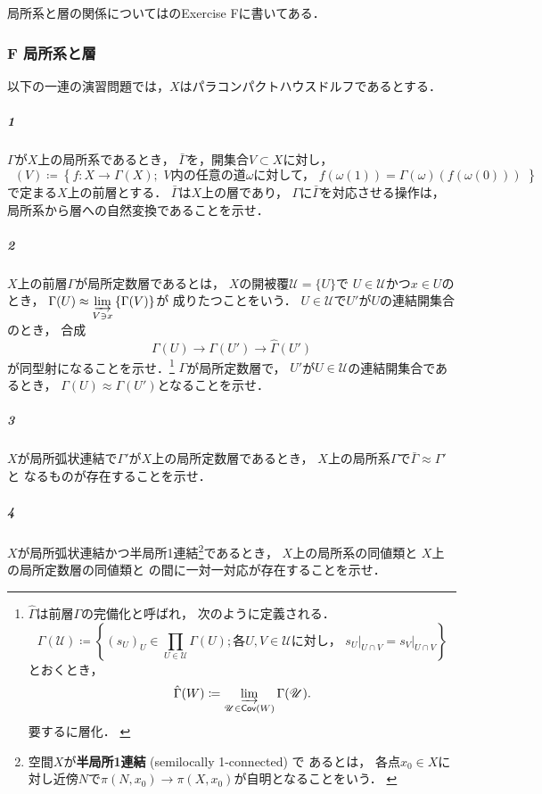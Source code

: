 \subsection{{\cite[Chap 6]{Sp66}}}

局所系と層の関係については\cite[Chap 6]{Sp66}のExercise Fに書いてある．

\subsubsection*{F 局所系と層}

以下の一連の演習問題では，\(X\)はパラコンパクトハウスドルフであるとする．

\subparagraph{1}
\(\Gamma\)が\(X\)上の局所系であるとき，
\(\bar{\Gamma}\)を，開集合\(V\subset X\)に対し，
\[\mathop{\bar{\Gamma}}(V)\coloneqq\left\{
    f\colon X\to \Gamma(X);\text{
        \(V\)内の任意の道\(\omega\)に対して，
        \(f(\omega(1))
        =\Gamma(\omega)\left(f\left(\omega(0)\right)\right)\)
    }
\right\}\]で定まる\(X\)上の前層とする．
\(\bar{\Gamma}\)は\(X\)上の層であり，
\(\Gamma\)に\(\bar{\Gamma}\)を対応させる操作は，
局所系から層への自然変換であることを示せ．


\subparagraph{2}
\(X\)上の前層\(\Gamma\)が局所定数層であるとは，
\(X\)の開被覆\(\mathscr{U}=\{U\}\)で
\(U\in\mathscr{U}\)かつ\(x\in U\)のとき，
\(\Gamma(U)\approx\indlim[V\ni x]\left\{\Gamma(V)\right\}\)が
成りたつことをいう．
\(U\in\mathscr{U}\)で\(U'\)が\(U\)の連結開集合のとき，
合成
\[
    \Gamma(U)\to\Gamma(U')\to\hat{\Gamma}(U')
\]
が同型射になることを示せ．\footnote{
    \(\hat{\Gamma}\)は前層\(\Gamma\)の完備化と呼ばれ，
    次のように定義される．
    \[
        \Gamma(\mathscr{U})\coloneqq\left\{(s_U)_U\in\prod_{U\in\mathscr{U}}^{}\Gamma(U);
            \text{各\(U, V\in\mathscr{U}\)に対し，
            \(s_U\rvert_{U\cap V}
            =s_V\rvert_{U\cap V}\)}\right\}
    \]とおくとき，
    \[
        \hat{\Gamma}(W)\coloneqq 
        \indlim[\mathscr{U}\in\Cov(W)]\Gamma(\mathscr{U}).
    \]要するに層化．
    \cite[p.78]{Sp66}
    }
\(\Gamma\)が局所定数層で，
\(U'\)が\(U\in\mathscr{U}\)の連結開集合であるとき，
\(\Gamma(U)\approx\Gamma(U')\)となることを示せ．


\subparagraph{3}
\(X\)が局所弧状連結で\(\Gamma'\)が\(X\)上の局所定数層であるとき，
\(X\)上の局所系\(\Gamma\)で\(\bar{\Gamma}\approx\Gamma'\)と
なるものが存在することを示せ．

\subparagraph{4}
\(X\)が局所弧状連結かつ半局所1連結\footnote{
    空間\(X\)が\textbf{半局所1連結} (semilocally 1-connected) で
    あるとは，
    各点\(x_0\in X\)に対し近傍\(N\)で\(
        \pi(N,x_0)\to\pi(X,x_0)
    \)が自明となることをいう．
    \cite[p.78]{Sp66}
}であるとき，
\(X\)上の局所系の同値類と
\(X\)上の局所定数層の同値類と
の間に一対一対応が存在することを示せ．

